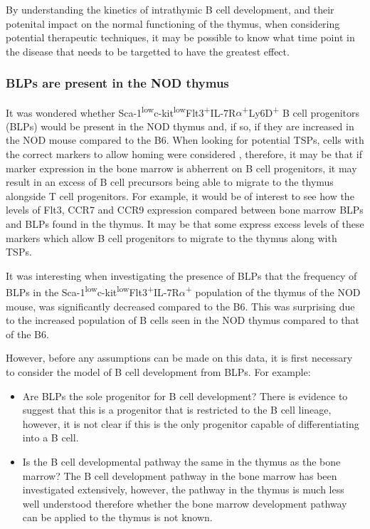 By understanding the kinetics of intrathymic B cell development, and their potenital impact on the normal functioning of the thymus, when considering potential therapeutic techniques, it may be possible to know what time point in the disease that needs to be targetted to have the greatest effect.

\subsubsection{BLPs are present in the NOD thymus}


It was wondered whether Sca-1\textsuperscript{low}c-kit\textsuperscript{low}Flt3\textsuperscript{+}IL-7R$\alpha$\textsuperscript{+}Ly6D\textsuperscript{+} B cell progenitors (BLPs) would be present in the NOD thymus and, if so, if they are increased in the NOD mouse compared to the B6.
When looking for potential TSPs, cells with the correct markers to allow homing were considered \citep{Zlotoff2011}, therefore, it may be that if marker expression in the bone marrow is abherrent on B cell progenitors, it may result in an excess of B cell precursors being able to migrate to the thymus alongside T cell progenitors.
For example, it would be of interest to see how the levels of Flt3, CCR7 and CCR9 expression compared between bone marrow BLPs and BLPs found in the thymus.
It may be that some express excess levels of these markers which allow B cell progenitors to migrate to the thymus along with TSPs.

It was interesting when investigating the presence of BLPs that the frequency of BLPs in the Sca-1\textsuperscript{low}c-kit\textsuperscript{low}Flt3\textsuperscript{+}IL-7R$\alpha$\textsuperscript{+} population of the thymus of the NOD mouse, was significantly decreased compared to the B6.
This was surprising due to the increased population of B cells seen in the NOD thymus compared to that of the B6.

However, before any assumptions can be made on this data, it is first necessary to consider the model of B cell development from BLPs.
For example:
\begin{itemize}
\item Are BLPs the sole progenitor for B cell development? There is evidence to suggest that this is a progenitor that is restricted to the B cell lineage, however, it is not clear if this is the only progenitor capable of differentiating into a B cell.
\item Is the B cell developmental pathway the same in the thymus as the bone marrow? The B cell development pathway in the bone marrow has been investigated extensively, however, the pathway in the thymus is much less well understood therefore whether the bone marrow development pathway can be applied to the thymus is not known. 
\end{itemize}

